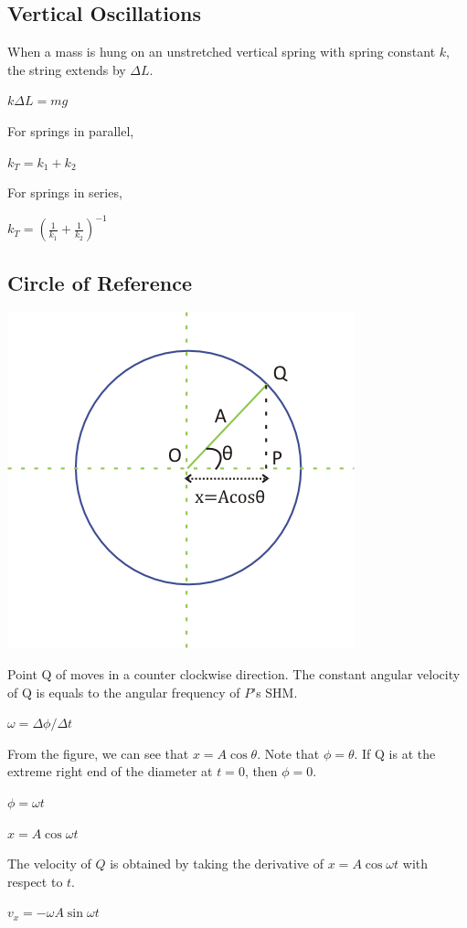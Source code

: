 \documentclass[a4paper]{article}
\begin{document}
\subsection{Vertical Oscillations}
When a mass is hung on an unstretched vertical spring with spring constant $k$, the string extends by $\Delta L$.
\begin{center}
$k\Delta L = mg$
\end{center}
For springs in parallel,
\begin{center}
$k_T = k_1 + k_2$
\end{center}
For springs in series,
\begin{center}
$\displaystyle k_T = \left(\frac{1}{k_1}+\frac{1}{k_2}\right)^{-1}$
\end{center}
\subsection{Circle of Reference}
\begin{center}
  \includegraphics[width=5 cm]{CircleOfReference.png}
\end{center}
Point Q of moves in a counter clockwise direction. The constant angular velocity of Q is equals to the angular frequency of $P$'s SHM.
\begin{center}
$\omega = \Delta\phi/\Delta t$
\end{center}
From the figure, we can see that $x = A\cos{\theta}$. Note that $\phi = \theta$.
If Q is at the extreme right end of the diameter at $t = 0$, then $\phi = 0$.
\begin{center}
$\phi = \omega t$
\end{center}

\begin{center}
$x = A\cos{\omega t}$
\end{center}
The velocity of $Q$ is obtained by taking the derivative of  $x = A\cos{\omega t}$ with respect to $t$.     
\begin{center}
$v_{x} = -\omega A\sin{\omega t}$
\end{center}
     
\end{document}
